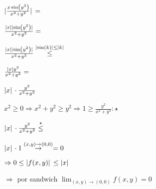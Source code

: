 \documentclass[../parcial.tex]{subfiles}
\begin{document}
\begin{enumerate}
            $ \abs*{\frac{x\sin(y^2)}{x^2+y^2}} = $

            $ \frac{\abs*{x}\abs*{\sin(y^2)}}{x^2+y^2} = $

            $ \frac{\abs*{x}\abs*{\sin(y^2)}}{x^2+y^2} \stackrel{\abs*{\sin(k)} \leq \abs*{k}}{\leq} $

            $ \frac{\abs*{x}y^2}{x^2+y^2} = $

            $ \abs*{x}\cdot\frac{y^2}{x^2+y^2} $
            
            \qquad $ x^2 \geq 0 \Rightarrow x^2 + y^2 \geq y^2 \Rightarrow 1 \geq \frac{y^2}{x^2 + y^2} : \star $
            
            $ \abs*{x}\cdot\frac{y^2}{x^2+y^2} \stackrel{\star}{\leq}$

            $ \abs*{x}\cdot 1 \stackrel{(x,y)\to (0,0)}{\to} = 0$

            $\Rightarrow 0 \leq \abs*{f(x,y)} \leq \abs*{x} $

            $ \Rightarrow $ por sandwich $\lim_{(x,y) \to (0,0)} f(x,y) = 0$

    \end{enumerate}
\end{document}
